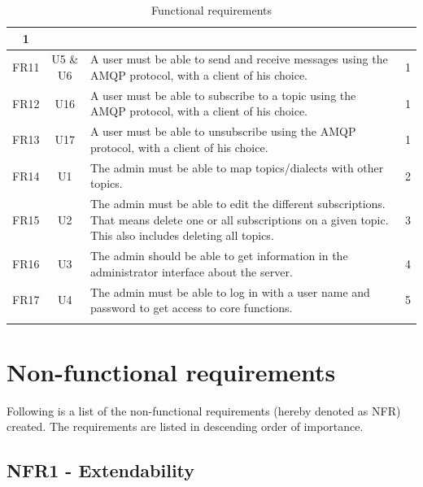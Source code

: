 \begin{longtable}{@{\extracolsep{\fill}}|l|l|p{8cm}|l|@{}}
\multicolumn{1}{c|}{1} \\ \hline
\multicolumn{1}{|c|}{FR11} & \multicolumn{1}{c|}{U5 \& U6} & A user must be able to send and receive messages using the AMQP protocol, with a client of his choice. &
\multicolumn{1}{c|}{1} \\ \hline
\multicolumn{1}{|c|}{FR12} & \multicolumn{1}{c|}{U16} & A user must be able to subscribe to a topic using the AMQP protocol, with a client of his choice. &
\multicolumn{1}{c|}{1} \\ \hline
\multicolumn{1}{|c|}{FR13} & \multicolumn{1}{c|}{U17} & A user must be able to unsubscribe using the AMQP protocol, with a client of his choice. &
\multicolumn{1}{c|}{1} \\ \hline
\multicolumn{1}{|c|}{FR14} & \multicolumn{1}{c|}{U1} & The admin must be able to map topics/dialects with other topics. &
\multicolumn{1}{c|}{2} \\ \hline
\multicolumn{1}{|c|}{FR15} & \multicolumn{1}{c|}{U2} & The admin must be able to edit the different subscriptions. That means delete one or all subscriptions on a given topic. This also includes deleting all topics. & \multicolumn{1}{c|}{3} \\ \hline
\multicolumn{1}{|c|}{FR16} & \multicolumn{1}{c|}{U3} & The admin should be able to get information in the administrator interface about the server. &  \multicolumn{1}{c|}{4} \\ \hline
\multicolumn{1}{|c|}{FR17} & \multicolumn{1}{c|}{U4} & The admin must be able to log in with a user name and password to get access to core functions. & \multicolumn{1}{c|}{5} \\ \hline
\caption{Functional requirements}
\label{tab:func-requirements}
\end{longtable}

\clearpage

\section{Non-functional requirements}
\label{sec:requirements_engineering-non_functional_requirements}

Following is a list of the non-functional requirements (hereby denoted as NFR) created. The requirements are listed in descending order of importance. 

\subsection{NFR1 - Extendability}
\label{subsec:requirements_engineering-non_functional_requirements-extendibility}


